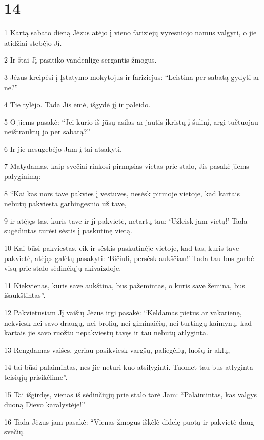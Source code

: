 \chapter{14}


\par 1 Kartą sabato dieną Jėzus atėjo į vieno fariziejų vyresniojo namus valgyti, o jie atidžiai stebėjo Jį. 
\par 2 Ir štai Jį pasitiko vandenlige sergantis žmogus. 
\par 3 Jėzus kreipėsi į Įstatymo mokytojus ir fariziejus: “Leistina per sabatą gydyti ar ne?” 
\par 4 Tie tylėjo. Tada Jis ėmė, išgydė jį ir paleido. 
\par 5 O jiems pasakė: “Jei kurio iš jūsų asilas ar jautis įkristų į šulinį, argi tučtuojau neištrauktų jo per sabatą?” 
\par 6 Ir jie nesugebėjo Jam į tai atsakyti. 
\par 7 Matydamas, kaip svečiai rinkosi pirmąsias vietas prie stalo, Jis pasakė jiems palyginimą: 
\par 8 “Kai kas nors tave pakvies į vestuves, nesėsk pirmoje vietoje, kad kartais nebūtų pakviesta garbingesnio už tave, 
\par 9 ir atėjęs tas, kuris tave ir jį pakvietė, netartų tau: ‘Užleisk jam vietą!’ Tada sugėdintas turėsi sėstis į paskutinę vietą. 
\par 10 Kai būsi pakviestas, eik ir sėskis paskutinėje vietoje, kad tas, kuris tave pakvietė, atėjęs galėtų pasakyti: ‘Bičiuli, persėsk aukščiau!’ Tada tau bus garbė visų prie stalo sėdinčiųjų akivaizdoje. 
\par 11 Kiekvienas, kuris save aukština, bus pažemintas, o kuris save žemina, bus išaukštintas”. 
\par 12 Pakvietusiam Jį vaišių Jėzus irgi pasakė: “Keldamas pietus ar vakarienę, nekviesk nei savo draugų, nei brolių, nei giminaičių, nei turtingų kaimynų, kad kartais jie savo ruožtu nepakviestų tavęs ir tau nebūtų atlyginta. 
\par 13 Rengdamas vaišes, geriau pasikviesk vargšų, paliegėlių, luošų ir aklų, 
\par 14 tai būsi palaimintas, nes jie neturi kuo atsilyginti. Tuomet tau bus atlyginta teisiųjų prisikėlime”. 
\par 15 Tai išgirdęs, vienas iš sėdinčiųjų prie stalo tarė Jam: “Palaimintas, kas valgys duoną Dievo karalystėje!” 
\par 16 Tada Jėzus jam pasakė: “Vienas žmogus iškėlė didelę puotą ir pakvietė daug svečių. 
